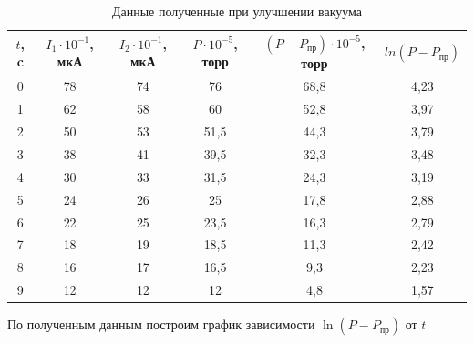 \documentclass{letnab}
\begin{document}
\begin{table}[H]
	\centering
	\caption{Данные полученные при улучшении вакуума}
	\begin{tabular}{c c c| c c c}
		\toprule
		$t$, c & $I_1\cdot10^{-1}$, мкА & $I_2\cdot10^{-1}$, мкА & $P\cdot10^{-5}$, торр & $(P-P_\text{пр})\cdot10^{-5}$, торр & $ln(P-P_\text{пр})$ \\ \midrule
		0    & 78                     & 74                     & 76                  & 68,8                              & 4,23                 \\ 
		1    & 62                     & 58                     & 60                  & 52,8                              & 3,97                 \\ 
		2    & 50                     & 53                     & 51,5                & 44,3                              & 3,79                 \\ 
		3    & 38                     & 41                     & 39,5                & 32,3                              & 3,48                 \\ 
		4    & 30                     & 33                     & 31,5                & 24,3                              & 3,19                 \\ 
		5    & 24                    & 26                     & 25                  & 17,8                              & 2,88                 \\ 
		6    & 22                     & 25                     & 23,5                & 16,3                              & 2,79                 \\ 
		7    & 18                     & 19                     & 18,5                & 11,3                              & 2,42                 \\ 
		8    & 16                     & 17                     & 16,5                & 9,3                               & 2,23                 \\ 
		9    & 12                     & 12                     & 12                  & 4,8                               & 1,57                 \\ \bottomrule
		\end{tabular}
		\end{table}
По полученным данным построим график зависимости $\ln(P-P_\text{пр})$ от $t$
\end{document}
